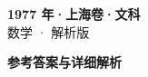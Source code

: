 \documentclass[zihao=-4, a4paper]{ctexart}
\begin{document}
\begin{center}
  {\Large\bfseries 1977 年·上海卷·文科}\\[4pt]
  {\large 数学 · 解析版}
\end{center}
\medskip
{}

\clearpage
{}
\begin{center}{\Large\bfseries 参考答案与详细解析}\end{center}
\medskip

\end{document}

